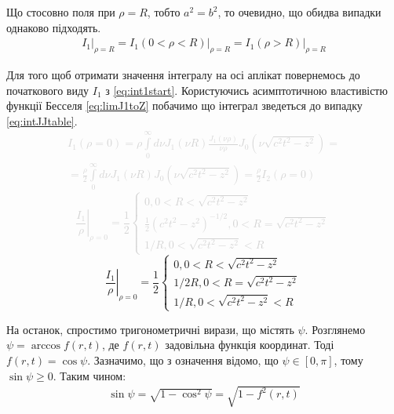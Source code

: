 Що стосовно поля при $ \rho = R $, тобто $ a^2 = b^2 $, то очевидно, що обидва 
випадки однаково підходять.
%
\begin{equation*} \begin{aligned}
\left. I_1 \right|_{\rho = R} = 
\left. I_1 \left(0 < \rho < R \right) \right|_{\rho = R} =
\left. I_1 \left( \rho > R \right) \right|_{\rho = R}
\end{aligned} \end{equation*}

Для того щоб отримати значення інтегралу на осі аплікат повернемось до 
початкового виду $ I_1 $ з \eqref{eq:int1start}. Користуючись асимптотичною 
властивістю функції Бесселя \eqref{eq:limJ1toZ} побачимо що інтеграл 
зведеться до випадку \eqref{eq:intJJtable}.
%
\textcolor{lightgray} {\begin{equation*} \begin{aligned}
I_1 \left( \rho = 0 \right) = \rho \int\limits_{0}^{\infty} d \nu
J_1 \left( \nu R \right) \frac{J_1 \left( \nu \rho \right) }{\nu \rho}
J_0 \left( \nu \sqrt{c^2 t^2 - z^2} \right) = \\
= \frac{\rho}{2} \int\limits_{0}^{\infty} d \nu
J_1 \left( \nu R \right) J_0 \left( \nu \sqrt{c^2 t^2 - z^2} \right) = 
\frac{\rho}{2} I_2 \left( \rho = 0 \right)
\end{aligned} \end{equation*} }
%
\textcolor{lightgray} {\begin{equation*}
\left. \frac{I_1}{\rho} \right|_{\rho = 0} = \frac{1}{2} \begin{cases}
0, 0 < R < \sqrt{c^2t^2 - z^2} \\
\frac{1}{2} \left( c^2t^2 - z^2 \right)^{-1/2}, 0 < R = \sqrt{c^2t^2 - z^2} \\ 
1/R, 0 < \sqrt{c^2t^2 - z^2} < R 
\end{cases}
\end{equation*} }
%
\begin{equation}
\left. \frac{I_1}{\rho} \right|_{\rho = 0} = \frac{1}{2} \begin{cases}
0, 0 < R < \sqrt{c^2t^2 - z^2} \\
1/2R, 0 < R = \sqrt{c^2t^2 - z^2} \\ 
1/R, 0 < \sqrt{c^2t^2 - z^2} < R 
\end{cases}
\end{equation}

На останок, спростимо тригонометричні вирази, що містять $ \psi $. Розглянемо 
$ \psi = \arccos f(r,t) $, де $ f(r,t) $ задовільна функція координат. 
Тоді $ f(r,t) = \cos \psi $. Зазначимо, що з означення відомо, що 
$ \psi \in \left[ 0, \pi \right] $, тому $ \sin \psi \geq 0 $. Таким чином:
%
\begin{equation*} \begin{aligned}
\sin \psi = \sqrt{1 - \cos^2{\psi}} = \sqrt{1 - f^2(r,t)}
\end{aligned} \end{equation*}

